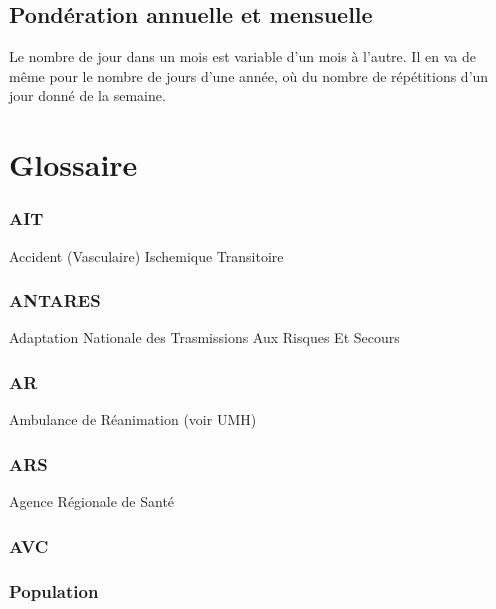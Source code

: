 \documentclass[12pt,english,french,twoside]{report}\usepackage[]{graphicx}\usepackage[]{color}
\begin{document}
\section*{Pondération annuelle et mensuelle}
Le nombre de jour dans un mois est variable d'un mois à l'autre. Il en va de même pour le nombre de jours d'une année, où du nombre de répétitions d'un jour donné de la semaine.


\newpage
\chapter{Glossaire}





\subsection*{AIT}
Accident (Vasculaire) Ischemique Transitoire

\subsection*{ANTARES}
Adaptation Nationale des Trasmissions Aux Risques Et Secours

\subsection*{AR}
Ambulance de Réanimation (voir UMH)

\subsection*{ARS}
Agence Régionale de Santé

\subsection*{AVC}

\subsection*{Population}
\end{document}
